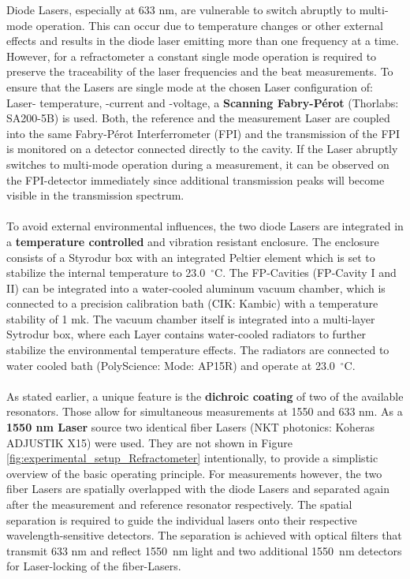\noindent
Diode Lasers, especially at 633 nm, are vulnerable to switch abruptly to multi-mode operation. This can occur due to temperature changes or other external effects and results in the diode laser emitting more than one frequency at a time. However, for a refractometer a constant single mode operation is required to preserve the traceability of the laser frequencies and the beat measurements. To ensure that the Lasers are single mode at the chosen Laser configuration of: Laser- temperature, -current and -voltage, a \textbf{Scanning Fabry-Pérot} (Thorlabs: SA200-5B) is used. Both, the reference and the measurement Laser are coupled into the same Fabry-Pérot Interferrometer (FPI) and the transmission of the FPI is monitored on a detector connected directly to the cavity. If the Laser abruptly switches to multi-mode operation during a measurement, it can be observed on the FPI-detector immediately since additional transmission peaks will become visible in the transmission spectrum.\\\\
\noindent
To avoid external environmental influences, the two diode Lasers are integrated in a \textbf{temperature controlled} and vibration resistant enclosure. The enclosure consists of a Styrodur box with an integrated Peltier element which is set to stabilize the internal temperature to \mbox{23.0 $^{\circ}$C}. The FP-Cavities (FP-Cavity I and II) can be integrated into a water-cooled aluminum vacuum chamber, which is connected to a precision calibration bath (CIK: Kambic) with a temperature stability of 1 mk. The vacuum chamber itself is integrated into a multi-layer Sytrodur box, where each Layer contains water-cooled radiators to further stabilize the environmental temperature effects. The radiators are connected to water cooled bath (PolyScience: Mode: AP15R) and operate at \mbox{23.0 $^{\circ}$C}.\\\\
\noindent
As stated earlier, a unique feature is the \textbf{dichroic coating} of two of the available resonators. Those allow for simultaneous measurements at 1550 and 633 nm. As a \textbf{1550 nm Laser} source two identical fiber Lasers (NKT photonics: Koheras ADJUSTIK X15) were used. They are not shown in Figure \ref{fig:experimental_setup_Refractometer} intentionally, to provide a simplistic overview of the basic operating principle. For measurements however, the two fiber Lasers are spatially overlapped with the diode Lasers and separated again after the measurement and reference resonator respectively. The spatial separation is required to guide the individual lasers onto their respective wavelength-sensitive detectors. The separation is achieved with optical filters that transmit 633 nm and reflect \mbox{1550 nm} light and two additional \mbox{1550 nm} detectors for Laser-locking of the fiber-Lasers.
\newpage
